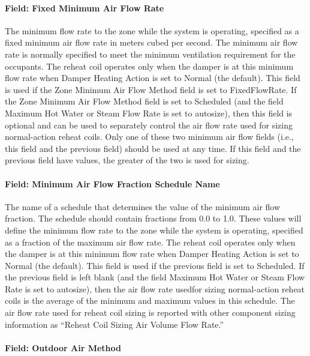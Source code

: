 \paragraph{Field: Fixed Minimum Air Flow Rate}\label{field-fixed-minimum-air-flow-rate-000}

The minimum flow rate to the zone while the system is operating, specified as a fixed minimum air flow rate in meters cubed per second. The minimum air flow rate is normally specified to meet the minimum ventilation requirement for the occupants. The reheat coil operates only when the damper is at this minimum flow rate when Damper Heating Action is set to Normal (the default). This field is used if the Zone Minimum Air Flow Method field is set to FixedFlowRate. If the Zone Minimum Air Flow Method field is set to Scheduled (and the field Maximum Hot Water or Steam Flow Rate is set to autosize), then this field is optional and can be used to separately control the air flow rate used for sizing normal-action reheat coils. Only one of these two minimum air flow fields (i.e., this field and the previous field) should be used at any time. If this field and the previous field have values, the greater of the two is used for sizing.

\paragraph{Field: Minimum Air Flow Fraction Schedule Name}\label{field-minimum-air-flow-fraction-schedule-name-000}

The name of a schedule that determines the value of the minimum air flow fraction. The schedule should contain fractions from 0.0 to 1.0. These values will define the minimum flow rate to the zone while the system is operating, specified as a fraction of the maximum air flow rate. The reheat coil operates only when the damper is at this minimum flow rate when Damper Heating Action is set to Normal (the default). This field is used if the previous field is set to Scheduled. If the previous field is left blank (and the field Maximum Hot Water or Steam Flow Rate is set to autosize), then the air flow rate usedfor sizing normal-action reheat coils is the average of the minimum and maximum values in this schedule. The air flow rate used for reheat coil sizing is reported with other component sizing information as ``Reheat Coil Sizing Air Volume Flow Rate.''

\paragraph{Field: Outdoor Air Method}\label{field-outdoor-air-method-8}


